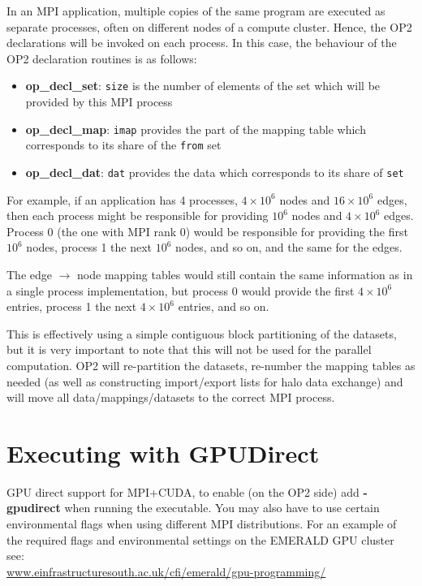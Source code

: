 \documentclass[11pt]{article}
\begin{document}
In an MPI application, multiple copies of the same program are executed as
separate processes, often on different nodes of a compute cluster.  Hence,
the OP2 declarations will be invoked on each process.  In this case, the
behaviour of the OP2 declaration routines is as follows:
\begin{itemize}
\item {\bf op\_decl\_set}: {\tt size} is the number of elements of the set which
will be provided by this MPI process

\item {\bf op\_decl\_map}: {\tt imap} provides the part of the mapping table
which corresponds to its share of the {\tt from} set

\item {\bf op\_decl\_dat}: {\tt dat} provides the data which corresponds to its
share of {\tt set}
\end{itemize}

For example, if an application has 4 processes, $4\!\times\! 10^6$ nodes and
$16 \!\times\! 10^6$ edges, then each process might be responsible for providing
$10^6$ nodes and $4\!\times\! 10^6$ edges. Process 0 (the one with MPI rank 0)
would be responsible for providing the first $10^6$ nodes, process 1 the
next $10^6$ nodes, and so on, and the same for the edges.

The edge $\rightarrow$ node mapping tables would still contain the same
information as in a single process implementation, but process 0 would provide
the first $4\!\times\! 10^6$ entries, process 1 the next $4\!\times\! 10^6$ entries,
and so on.

This is effectively using a simple contiguous block partitioning of the datasets,
but it is very important to note that this will not be used for the parallel
computation.  OP2 will re-partition the datasets,
re-number the mapping tables as needed (as well as constructing import/export
lists for halo data exchange) and will move all data/mappings/datasets to the
correct MPI process.


\newpage

\section{Executing with GPUDirect}

GPU direct support for MPI+CUDA, to enable (on the OP2 side) add \textbf{-gpudirect} when running the executable. You
may also have to use certain environmental flags when using different MPI distributions. For an example of the
required flags and environmental settings on the EMERALD GPU cluster
see: \\
\url{www.einfrastructuresouth.ac.uk/cfi/emerald/gpu-programming/}
\end{document}
